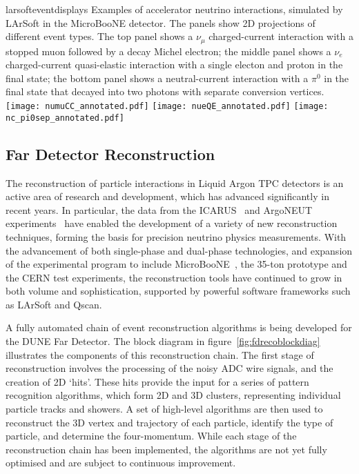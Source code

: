 \begin{cdrfigure}{larsofteventdisplays}
{Examples of accelerator neutrino interactions, simulated by LArSoft in the 
MicroBooNE detector. The panels show 2D projections of different event types.
The top panel shows a $\nu_{\mu}$ charged-current interaction with a stopped muon followed
by a decay Michel electron; the middle panel shows a $\nu_{e}$ charged-current 
quasi-elastic interaction with a single electon and proton in the final state;
the bottom panel shows a neutral-current interaction with a $\pi^{0}$ in the final state
that decayed into two photons with separate conversion vertices.}
\texttt{[image: numuCC\_annotated.pdf]}
\texttt{[image: nueQE\_annotated.pdf]}
\texttt{[image: nc\_pi0sep\_annotated.pdf]}
\end{cdrfigure}

\subsection{Far Detector Reconstruction}
\label{sec:detectors-sc-physics-software-reconstruction-fd}

The reconstruction of particle interactions in Liquid Argon TPC
detectors is an active area of research and development,
which has advanced significantly in recent years.
In particular, the data from the ICARUS~\cite{Amerio:2004ze,icarus-url,ICARUS-pizero,Antonello:2012hu} 
and ArgoNEUT experiments~\cite{Adamson:2013/02/28tla,argoneut-url,Acciarri:2013met}
have enabled the development of a variety of new reconstruction techniques,
forming the basis for precision neutrino physics measurements.
With the advancement of both single-phase and dual-phase technologies,
and expansion of the experimental program to include MicroBooNE~\cite{Chen:2007ae,microboone-url},
the 35-ton prototype and the CERN test experiments,
the reconstruction tools have continued to grow in both volume and sophistication,
supported by powerful software frameworks such as LArSoft and Qscan.


A fully automated chain of event reconstruction algorithms
is being developed for the DUNE Far Detector.
The block diagram in figure~\ref{fig:fdrecoblockdiag} illustrates 
the components of this reconstruction chain.
The first stage of reconstruction involves the processing of the
noisy ADC wire signals, and the creation of 2D `hits'. 
These hits provide the input for a series of pattern recognition algorithms,
which form 2D and 3D clusters, representing individual particle tracks and showers.
A set of high-level algorithms are then used to reconstruct the 
3D vertex and trajectory of each particle, identify the type of particle,
and determine the four-momentum.
While each stage of the reconstruction chain has been implemented,
the algorithms are not yet fully optimised and are subject to
continuous improvement.

